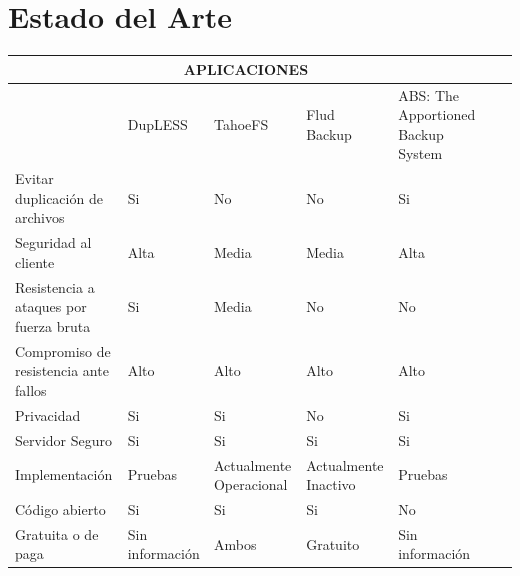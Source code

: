 \\ 
\\

\section{Estado del Arte}
\begin{tabular}{ |p{3cm}|p{2.5cm}|p{2.5cm}|p{2.5cm}|p{2.5cm}|p{2.5cm}|p{2.5cm}| }
\hline
\multicolumn{5}{|c|}{APLICACIONES}\\
\hline
{}  & {DupLESS } & {TahoeFS } & {Flud Backup} & {ABS: The Apportioned Backup System} \\
\hline
{ Evitar duplicación de archivos}  & {Si} & {No} & {No} & {Si}  \\
\hline
{Seguridad al cliente}  & {Alta} & {Media} & {Media} & {Alta}  \\
\hline
{Resistencia a ataques por fuerza bruta}  & {Si} & {Media} & { No} & {No}  \\
\hline
{Compromiso de resistencia ante fallos}  & {Alto} & {Alto} & {Alto} & {Alto}  \\
\hline
{Privacidad}  & {Si} & {Si}  & {No} & { Si }  \\
\hline
{Servidor Seguro}  & {Si} & {Si} & {Si } & {Si} \\
\hline
{Implementación }  & { Pruebas } & {Actualmente Operacional} & { Actualmente Inactivo } & {Pruebas }  \\
\hline
{Código abierto}  & {Si} & {Si} & {Si} & {No}  \\
\hline
{Gratuita o de paga}  & {Sin información} & {Ambos} & {Gratuito} & {Sin información} \\
\hline
\end{tabular}

